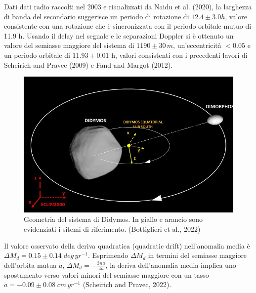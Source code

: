 \documentclass[a4paper,11pt,openright]{book}
\begin{document}
Dati dati radio raccolti nel 2003 e rianalizzati da Naidu et al. (2020), la larghezza di banda del secondario suggerisce un periodo di rotazione di $12.4\pm 3.0h$, valore consistente con una rotazione che è sincronizzata con il periodo orbitale mutuo di 11.9 h. Usando il delay nel segnale e le separazioni Doppler si è ottenuto un valore del semiasse maggiore del sistema di $1190\pm 30\, m$, un'eccentricità $<0.05$ e un periodo orbitale di $11.93\pm 0.01$ h, valori consistenti con i precedenti lavori di Scheirich and Pravec (2009) e Fand and Margot (2012). 

\begin{figure}[!h]
    \centering
    \includegraphics[scale=0.78]{figure/system_orbit.jpg}
    \caption{Geometria del sistema di Didymos. In giallo e arancio sono evidenziati i sitemi di riferimento. (Bottiglieri et al., 2022)}
    \label{fig:system_orbit}
\end{figure}

Il valore osservato della deriva quadratica (quadratic drift) nell'anomalia media è $\Delta M_d=0.15\pm 0.14\; deg\,yr^{-1}$. Esprimendo $\Delta M_d$ in termini del semiasse maggiore dell'orbita mutua $a$, $\Delta M_d=-\frac{3n\dot{a}}{4a}$, la deriva dell'anomalia media implica uno spostamento verso valori minori del semiasse maggiore con un tasso \\$\dot{a}=-0.09 \pm 0.08\;cm\,yr^{-1}$ (Scheirich and Pravec, 2022). 
\end{document}
